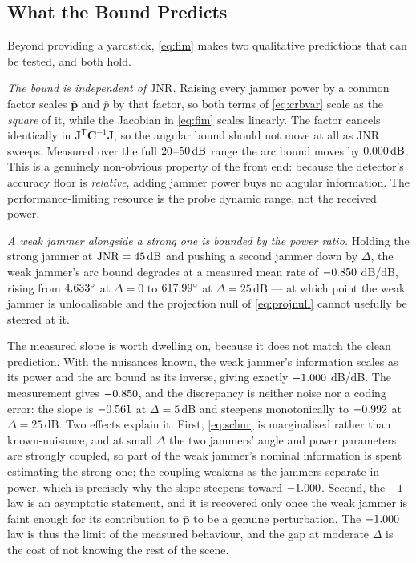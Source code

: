 \documentclass[journal]{IEEEtran}
\newcommand{\pv}{\mathbf{p}}
\newcommand{\JNR}{\mathrm{JNR}}
\newcommand{\Tr}{\mathsf{T}}
\newcommand{\dB}{\,\mathrm{dB}}
\newcommand{\degs}{^\circ}
\begin{document}
\subsection{What the Bound Predicts}
\label{sec:bounds:predict}

Beyond providing a yardstick, \eqref{eq:fim} makes two qualitative predictions
that can be tested, and both hold.

\emph{The bound is independent of $\JNR$.} Raising every jammer power by a
common factor scales $\bar{\pv}$ and $\bar{p}$ by that factor, so both terms of
\eqref{eq:crbvar} scale as the \emph{square} of it, while the Jacobian in
\eqref{eq:fim} scales linearly. The factor cancels identically in
$\mathbf{J}^{\Tr}\mathbf{C}^{-1}\mathbf{J}$, so the angular bound should not
move at all as $\JNR$ sweeps. Measured over the full $20$--$\jnrHi\dB$
range the arc bound moves by $\jnrFlatSpread\dB$. This is a genuinely
non-obvious property of the front end: because the detector's accuracy floor
is \emph{relative}, adding jammer power buys no angular information. The
performance-limiting resource is the probe dynamic range, not the received
power.

\emph{A weak jammer alongside a strong one is bounded by the power ratio.}
Holding the strong jammer at $\JNR = \weakStrongJnr\dB$ and pushing a second
jammer down by $\Delta$, the weak jammer's arc bound degrades at a measured
mean rate of $-0.850$ dB/dB, rising from $\weakCRBnear\degs$ at
$\Delta = 0$ to $\weakCRBfar\degs$ at $\Delta = 25\dB$ --- at which point the
weak jammer is unlocalisable and the projection null of \eqref{eq:projnull}
cannot usefully be steered at it.

The measured slope is worth dwelling on, because it does not match the clean
prediction. With the nuisances known, the weak jammer's information scales as
its power and the arc bound as its inverse, giving exactly
$-1.000$ dB/dB. The measurement gives $-0.850$, and the
discrepancy is neither noise nor a coding error: the slope is
$-0.561$ at $\Delta = 5\dB$ and steepens monotonically to
$-0.992$ at $\Delta = 25\dB$. Two effects explain it. First,
\eqref{eq:schur} is marginalised rather than known-nuisance, and at small
$\Delta$ the two jammers' angle and power parameters are strongly coupled, so
part of the weak jammer's nominal information is spent estimating the strong
one; the coupling weakens as the jammers separate in power, which is precisely
why the slope steepens toward $-1.000$. Second, the $-1$ law is an
asymptotic statement, and it is recovered only once the weak jammer is faint
enough for its contribution to $\bar{\pv}$ to be a genuine perturbation. The
$-1.000$ law is thus the limit of the measured behaviour, and the gap
at moderate $\Delta$ is the cost of not knowing the rest of the scene.
\end{document}
